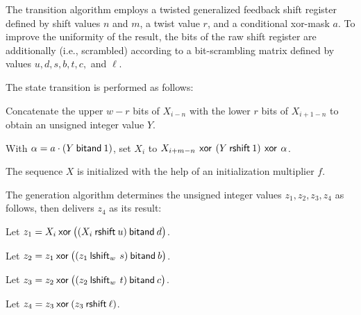 \pnum
The transition algorithm%
%
employs a twisted generalized feedback shift register
defined by shift values $n$ and $m$, a twist value $r$,
and a conditional xor-mask $a$.
To improve the uniformity of the result,
the bits of the raw shift register are additionally 
(i.e., scrambled)
according to a bit-scrambling matrix
defined by values $u, d, s, b, t, c,$ and $\ell$.

The state transition is performed as follows:
\begin{enumeratea}
 \item
   Concatenate
     the upper $w-r$ bits of $X_{i-n}$
   with
     the lower $r$ bits of $X_{i+1-n}$
   to obtain an unsigned integer value $Y$.
 \item
   With $\alpha = a \cdot (Y \mathbin{\mathsf{bitand}} 1)$,
   set $X_i$ to
     $X_{i+m-n} \, \mathbin{\mathsf{xor}} \, (Y \mathbin{\mathsf{rshift}} 1) \, \mathbin{\mathsf{xor}} \, \alpha$.
\end{enumeratea}
The sequence $X$ is initialized
with the help of an initialization multiplier $f$.

\pnum
The generation algorithm%
%
 determines the unsigned integer values $z_1, z_2, z_3, z_4$ as follows,
 then delivers $z_4$ as its result:
\begin{enumeratea}
 \item
   Let $z_1 = X_i \mathbin{\mathsf{xor}} \bigl(( X_i \mathbin{\mathsf{rshift}} u ) \mathbin{\mathsf{bitand}} d\bigr)$.
 \item
   Let $z_2 = z_1 \mathbin{\mathsf{xor}} \bigl( (z_1 \mathbin{\mathsf{lshift}_{w}} \, s) \mathbin{\mathsf{bitand}} b \bigr)$.
 \item
   Let $z_3 = z_2 \mathbin{\mathsf{xor}} \bigl( (z_2 \mathbin{\mathsf{lshift}_{w}} \, t) \mathbin{\mathsf{bitand}} c \bigr)$.
 \item
   Let $z_4 = z_3 \mathbin{\mathsf{xor}} ( z_3 \mathbin{\mathsf{rshift}} \ell )$.
\end{enumeratea}

